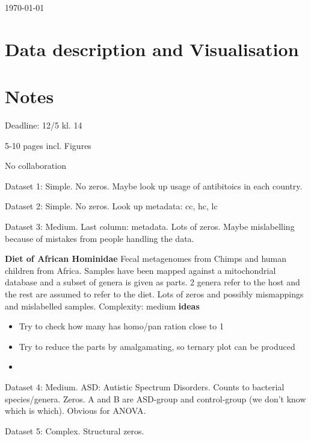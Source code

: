 \documentclass{article}
\begin{document}
\today
\tableofcontents


\section{Data description and Visualisation}\label{sec: Descript_visual} %






\newpage{}

\section{Notes}

Deadline: 12/5 kl. 14

5-10 pages incl. Figures

No collaboration

Dataset 1: Simple. No zeros. Maybe look up usage of antibitoics in each country.

Dataset 2: Simple. No zeros. Look up metadata: cc, hc, lc \newline

Dataset 3: Medium. Last column: metadata. Lots of zeros. Maybe mislabelling because of mistakes from people handling the data.\newline

\textbf{Diet of African Hominidae}
Fecal metagenomes from Chimps and human children from Africa. Samples have been mapped against a mitochondrial database and a subset of genera is given as parts. 2 genera refer to the host and the rest are assumed to refer to the diet. Lots of zeros and possibly mismappings and mislabelled samples. Complexity: medium \newline
\textbf{ideas}
\begin{itemize}
  \item Try to check how many has homo/pan ration close to 1 
  \item  Try to reduce the parts by amalgamating, so ternary 
    plot can be produced 
  \item  
\end{itemize}

Dataset 4: Medium. ASD: Autistic Spectrum Disorders. Counts to bacterial species/genera. Zeros. A and B are ASD-group and control-group (we don’t know which is which). Obvious for ANOVA. \newline

Dataset 5: Complex. Structural zeros.
\end{document}
